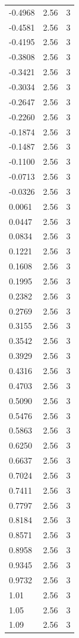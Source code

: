 \begin{longtable}{lrr}
  -0.4968 & 2.56 & 3 \\
  -0.4581 & 2.56 & 3 \\
  -0.4195 & 2.56 & 3 \\
  -0.3808 & 2.56 & 3 \\
  -0.3421 & 2.56 & 3 \\
  -0.3034 & 2.56 & 3 \\
  -0.2647 & 2.56 & 3 \\
  -0.2260 & 2.56 & 3 \\
  -0.1874 & 2.56 & 3 \\
  -0.1487 & 2.56 & 3 \\
  -0.1100 & 2.56 & 3 \\
  -0.0713 & 2.56 & 3 \\
  -0.0326 & 2.56 & 3 \\
  0.0061 & 2.56 & 3 \\
  0.0447 & 2.56 & 3 \\
  0.0834 & 2.56 & 3 \\
  0.1221 & 2.56 & 3 \\
  0.1608 & 2.56 & 3 \\
  0.1995 & 2.56 & 3 \\
  0.2382 & 2.56 & 3 \\
  0.2769 & 2.56 & 3 \\
  0.3155 & 2.56 & 3 \\
  0.3542 & 2.56 & 3 \\
  0.3929 & 2.56 & 3 \\
  0.4316 & 2.56 & 3 \\
  0.4703 & 2.56 & 3 \\
  0.5090 & 2.56 & 3 \\
  0.5476 & 2.56 & 3 \\
  0.5863 & 2.56 & 3 \\
  0.6250 & 2.56 & 3 \\
  0.6637 & 2.56 & 3 \\
  0.7024 & 2.56 & 3 \\
  0.7411 & 2.56 & 3 \\
  0.7797 & 2.56 & 3 \\
  0.8184 & 2.56 & 3 \\
  0.8571 & 2.56 & 3 \\
  0.8958 & 2.56 & 3 \\
  0.9345 & 2.56 & 3 \\
  0.9732 & 2.56 & 3 \\
  1.01 & 2.56 & 3 \\
  1.05 & 2.56 & 3 \\
  1.09 & 2.56 & 3 \\

\end{longtable}
